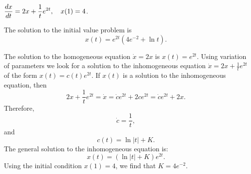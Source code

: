 \documentclass{ximera}
\begin{document}
\begin{exercise}   \label{c14.2.6d}
$\displaystyle \frac{dx}{dt} = 2x+\frac{1}{t}e^{2t}, \quad x(1)=4$.

\begin{solution}
\ans The solution to the initial value problem is
\[
x(t) = e^{2t}(4e^{-2}+\ln t).
\]

\soln The solution to the homogeneous equation $\dot{x}=2x$ is $x(t)=e^{2t}$.
 Using variation of parameters we look for a solution to the inhomogeneous
equation $\dot{x}=2x+\frac{1}{t}e^{2t}$ of the form $x(t)=c(t)e^{2t}$.  If
$x(t)$ is a solution to the inhomogeneous equation, then
\[
2x+\frac{1}{t}e^{2t} =\dot{x}=\dot{c}e^{2t}+2ce^{2t} = \dot{c}e^{2t}+2x.
\]
Therefore, 
\[
\dot{c} = \frac{1}{t},
\]
and 
\[
c(t) = \ln|t| + K.
\]
The general solution to the inhomogeneous equation is:
\[
x(t) = (\ln|t| + K)e^{2t}.
\]
Using the initial condition $x(1)=4$, we find that $K=4e^{-2}$.



\end{solution}
\end{exercise}



\CEXER
\end{document}
